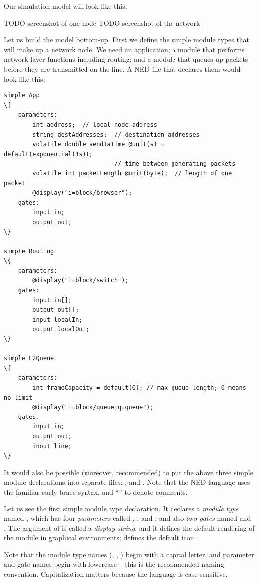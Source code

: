 Our simulation model will look like this:

TODO screenshot of one node
TODO screenshot of the network

Let us build the model bottom-up. First we define the simple module
types that will make up a network node. We need an application;
a module that performs network layer functions including routing;
and a module that queues up packets before they are transmitted on the
line. A NED file that declares them would look like this:

\begin{Verbatim}[commandchars=\\\{\}]
simple App
\{
    parameters:
        int address;  // local node address
        string destAddresses;  // destination addresses
        volatile double sendIaTime @unit(s) = default(exponential(1s));
                               // time between generating packets
        volatile int packetLength @unit(byte);  // length of one packet
        @display("i=block/browser");
    gates:
        input in;
        output out;
\}

simple Routing
\{
    parameters:
        @display("i=block/switch");
    gates:
        input in[];
        output out[];
        input localIn;
        output localOut;
\}

simple L2Queue
\{
    parameters:
        int frameCapacity = default(0); // max queue length; 0 means no limit
        @display("i=block/queue;q=queue");
    gates:
        input in;
        output out;
        inout line;
\}
\end{Verbatim}

It would also be possible (moreover, recommended) to put the above three
simple module declarations into separate  files: ,
 and . Note that the NED language uses
the familiar curly brace syntax, and ``\ttt{//}'' to denote comments.

Let us see the first simple module type declaration. It declares a
\textit{module type} named , which has four \textit{parameters}
called , ,  and ,
and also two \textit{gates} named  and . The argument of
 is called a \textit{display string}, and it defines
the default rendering of the module in graphical environments;
 defines the default icon.

\begin{note}
    Note that the module type names (, , )
    begin with a capital letter, and parameter and gate names begin with
    lowercase -- this is the recommended naming convention. Capitalization
    matters because the language is case sensitive.
\end{note}

